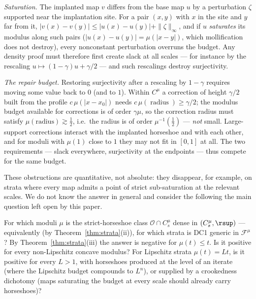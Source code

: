 \emph{Saturation.}  The implanted map $v$ differs from the base map $u$ by a
perturbation $\zeta$ supported near the implantation site.  For a pair $(x,y)$
with $x$ in the site and $y$ far from it,
$|v(x)-v(y)|\le|u(x)-u(y)|+\|\zeta\|_\infty$, and if $u$ \emph{saturates} its
modulus along such pairs ($|u(x)-u(y)|=\mu(|x-y|)$, which mollification does not
destroy), every nonconstant perturbation overruns the budget.  Any density proof
must therefore first create slack at all scales --- for instance by the
rescaling $u\mapsto(1-\gamma)u+\gamma/2$ --- and such rescalings destroy
surjectivity.

\emph{The repair budget.}  Restoring surjectivity after a rescaling by
$1-\gamma$ requires moving some value back to $0$ (and to $1$).  Within
$C^\mu$ a correction of height $\gamma/2$ built from the profile
$c\,\mu(|x-x_0|)$ needs $c\,\mu(\operatorname{radius})\ge\gamma/2$; the modulus
budget available for corrections is of order $\gamma\mu$, so the correction
radius must satisfy $\mu(\mathrm{radius})\gtrsim\tfrac12$, i.e.\ the radius is
of order $\mu^{-1}(\tfrac12)$ --- \emph{not} small.  Large-support corrections
interact with the implanted horseshoe and with each other, and for moduli with
$\mu(1)$ close to $1$ they may not fit in $[0,1]$ at all.  The two requirements
--- slack everywhere, surjectivity at the endpoints --- thus compete for the
same budget.

These obstructions are quantitative, not absolute: they disappear, for example,
on strata where every map admits a point of strict sub-saturation at the
relevant scales.  We do not know the answer in general and consider the
following the main question left open by this paper.

\begin{problem}\label{prob:strata}
For which moduli $\mu$ is the strict-horseshoe class $\mathcal O\cap C^\mu_s$
dense in $(C^\mu_s,\rsup)$ --- equivalently (by
Theorem~\ref{thm:strata}(ii)), for which strata is DC1 generic in
$\mathcal F^\mu$?  By Theorem~\ref{thm:strata}(iii) the answer is negative for
$\mu(t)\le t$.  Is it positive for every non-Lipschitz concave modulus?  For
Lipschitz strata $\mu(t)=Lt$, is it positive for every $L>1$, with horseshoes
produced at the level of an iterate (where the Lipschitz budget compounds to
$L^n$), or supplied by a crookedness dichotomy (maps saturating the budget at
every scale should already carry horseshoes)?
\end{problem}
